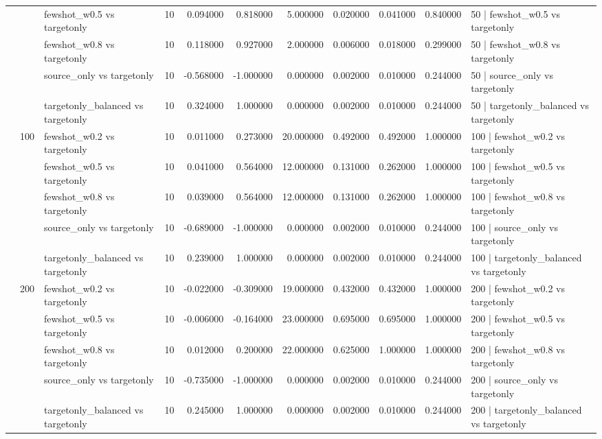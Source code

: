 \begin{tabular}{lllrrrrrrrl}
 &  & fewshot_w0.5 vs targetonly & 10 & 0.094000 & 0.818000 & 5.000000 & 0.020000 & 0.041000 & 0.840000 & 50 | fewshot_w0.5 vs targetonly \\
 &  & fewshot_w0.8 vs targetonly & 10 & 0.118000 & 0.927000 & 2.000000 & 0.006000 & 0.018000 & 0.299000 & 50 | fewshot_w0.8 vs targetonly \\
 &  & source_only vs targetonly & 10 & -0.568000 & -1.000000 & 0.000000 & 0.002000 & 0.010000 & 0.244000 & 50 | source_only vs targetonly \\
 &  & targetonly_balanced vs targetonly & 10 & 0.324000 & 1.000000 & 0.000000 & 0.002000 & 0.010000 & 0.244000 & 50 | targetonly_balanced vs targetonly \\
\cline{2-11}
 & \multirow[t]{5}{*}{100} & fewshot_w0.2 vs targetonly & 10 & 0.011000 & 0.273000 & 20.000000 & 0.492000 & 0.492000 & 1.000000 & 100 | fewshot_w0.2 vs targetonly \\
 &  & fewshot_w0.5 vs targetonly & 10 & 0.041000 & 0.564000 & 12.000000 & 0.131000 & 0.262000 & 1.000000 & 100 | fewshot_w0.5 vs targetonly \\
 &  & fewshot_w0.8 vs targetonly & 10 & 0.039000 & 0.564000 & 12.000000 & 0.131000 & 0.262000 & 1.000000 & 100 | fewshot_w0.8 vs targetonly \\
 &  & source_only vs targetonly & 10 & -0.689000 & -1.000000 & 0.000000 & 0.002000 & 0.010000 & 0.244000 & 100 | source_only vs targetonly \\
 &  & targetonly_balanced vs targetonly & 10 & 0.239000 & 1.000000 & 0.000000 & 0.002000 & 0.010000 & 0.244000 & 100 | targetonly_balanced vs targetonly \\
\cline{2-11}
 & \multirow[t]{5}{*}{200} & fewshot_w0.2 vs targetonly & 10 & -0.022000 & -0.309000 & 19.000000 & 0.432000 & 0.432000 & 1.000000 & 200 | fewshot_w0.2 vs targetonly \\
 &  & fewshot_w0.5 vs targetonly & 10 & -0.006000 & -0.164000 & 23.000000 & 0.695000 & 0.695000 & 1.000000 & 200 | fewshot_w0.5 vs targetonly \\
 &  & fewshot_w0.8 vs targetonly & 10 & 0.012000 & 0.200000 & 22.000000 & 0.625000 & 1.000000 & 1.000000 & 200 | fewshot_w0.8 vs targetonly \\
 &  & source_only vs targetonly & 10 & -0.735000 & -1.000000 & 0.000000 & 0.002000 & 0.010000 & 0.244000 & 200 | source_only vs targetonly \\
 &  & targetonly_balanced vs targetonly & 10 & 0.245000 & 1.000000 & 0.000000 & 0.002000 & 0.010000 & 0.244000 & 200 | targetonly_balanced vs targetonly \\

\end{tabular}
